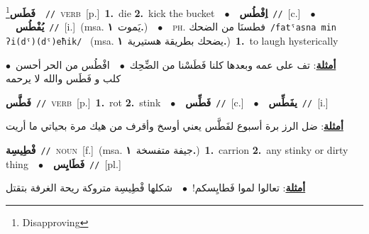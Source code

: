 \documentclass[10pt,a4paper,twoside]{article} %
\begin{document}
\begin{multicols}{2}
{\setlength\topsep{0pt}\textbf{\foreignlanguage{arabic}{فَطَس}}\footnote{Disapproving}\ \ {\color{gray}\texttt{//}\color{black}}\ \textsc{verb}\ [p.]\ \textbf{1.}~die  \textbf{2.}~kick the bucket\ \ $\bullet$\ \ \setlength\topsep{0pt}\textbf{\foreignlanguage{arabic}{اِفْطُس}}\ {\color{gray}\texttt{//}\color{black}}\ [c.]\ \ $\bullet$\ \ \setlength\topsep{0pt}\textbf{\foreignlanguage{arabic}{يُفْطُس}}\ {\color{gray}\texttt{//}\color{black}}\ [i.]\ \color{gray}(msa. \foreignlanguage{arabic}{يَموت}~\foreignlanguage{arabic}{\textbf{١.}})\color{black}\ \ $\bullet$\ \ \textsc{ph.} \color{gray} \foreignlanguage{arabic}{فطسنَا من الضحك}\color{black}\ {\color{gray}\texttt{/{\sffamily fatˤasna min ʔi(dˤ)(dˤ)eħik}/}\color{black}}\ \color{gray} (msa. \foreignlanguage{arabic}{يضحك بطريقة هستيرية}~\foreignlanguage{arabic}{\textbf{١.}})\color{black}\ \textbf{1.}~to laugh hysterically\  \begin{flushright}\color{gray}\foreignlanguage{arabic}{\textbf{\underline{\foreignlanguage{arabic}{أمثلة}}}: تف على عمه وبعدها كلنا فَطَسْنا من الضِّحِك\ $\bullet$\ \  افْطُس من الحر أحسن\ $\bullet$\ \  كلب و فَطَس والله لا يرحمه}\end{flushright}\color{black}} \vspace{2mm}

{\setlength\topsep{0pt}\textbf{\foreignlanguage{arabic}{فَطَّس}}\ {\color{gray}\texttt{//}\color{black}}\ \textsc{verb}\ [p.]\ \textbf{1.}~rot  \textbf{2.}~stink\ \ $\bullet$\ \ \setlength\topsep{0pt}\textbf{\foreignlanguage{arabic}{فَطِّس}}\ {\color{gray}\texttt{//}\color{black}}\ [c.]\ \ $\bullet$\ \ \setlength\topsep{0pt}\textbf{\foreignlanguage{arabic}{يفَطِّس}}\ {\color{gray}\texttt{//}\color{black}}\ [i.]\  \begin{flushright}\color{gray}\foreignlanguage{arabic}{\textbf{\underline{\foreignlanguage{arabic}{أمثلة}}}: ضل الرز برة أسبوع لفَطَّس يعني أوسخ وأقرف من هيك مرة بحياتي ما أريت}\end{flushright}\color{black}} \vspace{2mm}

{\setlength\topsep{0pt}\textbf{\foreignlanguage{arabic}{فْطِيسِة}}\ {\color{gray}\texttt{//}\color{black}}\ \textsc{noun}\ [f.]\ \color{gray}(msa. \foreignlanguage{arabic}{جيفة متفسخة}~\foreignlanguage{arabic}{\textbf{١.}})\color{black}\ \textbf{1.}~carrion  \textbf{2.}~any stinky or dirty thing\ \ $\bullet$\ \ \setlength\topsep{0pt}\textbf{\foreignlanguage{arabic}{فَطَايِس}}\ {\color{gray}\texttt{//}\color{black}}\ [pl.]\  \begin{flushright}\color{gray}\foreignlanguage{arabic}{\textbf{\underline{\foreignlanguage{arabic}{أمثلة}}}: تعالوا لموا فَطايِسكم!\ $\bullet$\ \  شكلها فْطِيسِة متروكة ريحة الغرفة بتقتل}\end{flushright}\color{black}} \vspace{2mm}


\end{multicols}
\end{document}

